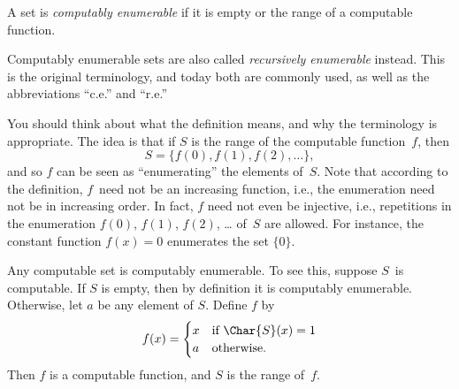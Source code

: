 \documentclass[../../../include/open-logic-section]{subfiles}
\begin{document}

\begin{defn}
A set is \emph{computably enumerable} if it is empty or the range of a
computable function.
\end{defn}

\begin{history}
Computably enumerable sets are also called \emph{recursively
  enumerable} instead. This is the original terminology, and today
both are commonly used, as well as the abbreviations ``c.e.'' and
``r.e.''
\end{history}

\begin{explain}
You should think about what the definition means, and why the
terminology is appropriate. The idea is that if $S$ is the range of
the computable function~$f$, then
\[
S = \{ f(0), f(1), f(2), \dots \},
\]
and so $f$ can be seen as ``enumerating'' the elements of~$S$. Note
that according to the definition, $f$~need not be an increasing
function, i.e., the enumeration need not be in increasing order. In
fact, $f$ need not even be injective, i.e., repetitions in the
enumeration $f(0)$, $f(1)$, $f(2)$, \dots{} of~$S$ are allowed. For
instance, the constant function $f(x) = 0$ enumerates the set $\{ 0
\}$.
\end{explain}

Any computable set is computably enumerable. To see this, suppose
$S$~is computable. If $S$ is empty, then by definition it is
computably enumerable. Otherwise, let $a$ be any element of
$S$. Define $f$ by
\[
f(x) =
\begin{cases}
x & \text{if $\Char{S}(x) = 1$} \\
a & \text{otherwise.}
\end{cases}
\]
Then $f$ is a computable function, and $S$ is the range of~$f$.
\end{document}
